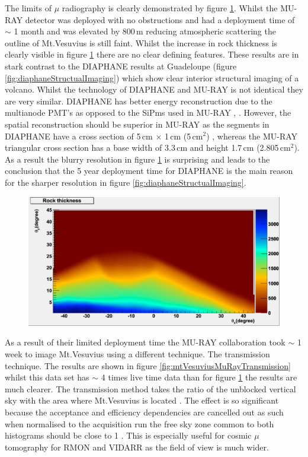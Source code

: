 The limits of $\mu$ radiography is clearly demonstrated by figure \ref{fig:mtVesuviusMuRayImaging}. Whilst the MU-RAY detector was deployed with no obstructions and had a deployment time of $\sim$ 1 month and was elevated by 800\,m reducing atmospheric scattering the outline of Mt.Vesuvius is still faint. Whilst the increase in rock thickness is clearly visible in figure \ref{fig:mtVesuviusMuRayImaging} there are no clear defining features. These results are in stark contrast to the DIAPHANE results at Guadeloupe (figure \ref{fig:diaphaneStructualImaging}) which show clear interior structural imaging of a volcano. Whilst the technology of DIAPHANE and MU-RAY is not identical they are very similar. DIAPHANE has better energy reconstruction due to the multianode PMT’s as opposed to the SiPms used in MU-RAY \cite{Marteau_2017}, \cite{ANASTASIO2013423}. However, the spatial reconstruction should be superior in MU-RAY as the segments in DIAPHANE have a cross section of 5\,cm $\times$ 1\,cm (5\,cm$^2$) \cite{MARTEAU201223}, whereas the MU-RAY triangular cross section has a base width of 3.3\,cm and height 1.7\,cm (2.805\,cm$^2$). As a result the blurry resolution in figure \ref{fig:mtVesuviusMuRayImaging} is surprising and leads to the conclusion that the 5 year deployment time for DIAPHANE is the main reason for the sharper resolution in figure \ref{fig:diaphaneStructualImaging}.

\begin{figure}[!h]
 \centering
 \includegraphics[width=0.6\linewidth]{Chapter5/Figs/Raster/mtVesuviusMuRayImaging.png}
 \label{fig:mtVesuviusMuRayImaging}
\end{figure}

As a result of their limited deployment time the MU-RAY collaboration took $\sim$ 1 week to image Mt.Vesuvius using a different technique. The transmission technique. The results are shown in figure \ref{fig:mtVesuviusMuRayTransmission} whilst this data set has $\sim$ 4 times live time data than for figure \ref{fig:mtVesuviusMuRayImaging} the results are much clearer. The transmission method takes the ratio of the unblocked vertical sky with the area where Mt.Vesuvius is located \cite{Ambrosino_2014}. The effect is so significant because the acceptance and efficiency dependencies are cancelled out as such when normalised to the acquisition run the free sky zone common to both histograms should be close to 1 \cite{Ambrosino_2014}. This is especially useful for cosmic $\mu$ tomography for RMON and VIDARR as the field of view is much wider.

